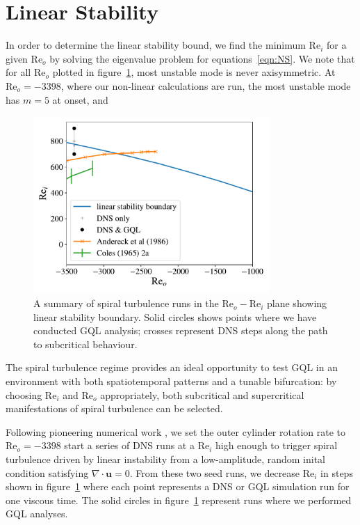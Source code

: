 \documentclass[openacc]{rstransa}%
\newcommand{\Reyn}{\mathrm{Re}}
\begin{document}
\section{Linear Stability}
\label{sec:linear}
In order to determine the linear stability bound, we find the minimum $\Reyn_i$ for a given $\Reyn_o$ by solving the eigenvalue problem for equations~\ref{eqn:NS}. We note that for all $\Reyn_o$ plotted in figure~\ref{fig:LSB}, most unstable mode is never axisymmetric. At $\Reyn_o=-3398$, where our non-linear calculations are run, the most unstable mode has $m = 5$ at onset, and 
\begin{figure}
    \centering
    \includegraphics[width=0.8\textwidth]{../figs/reo_rei_lsb.pdf}
    \caption{A summary of spiral turbulence runs in the $\Reyn_o-\Reyn_i$ plane showing linear stability boundary. Solid circles shows points where we have conducted GQL analysis; crosses represent DNS steps along the path to subcritical behaviour. }
    \label{fig:LSB}
\end{figure}
The spiral turbulence regime provides an ideal opportunity to test GQL in an environment with both spatiotemporal patterns and a tunable bifurcation: by choosing $\Reyn_i$ and $\Reyn_o$ appropriately, both subcritical and supercritical manifestations of spiral turbulence can be selected.

Following pioneering numerical work \cite{2009PhRvE..79c6309M, 2009PhRvE..80d6315M}, we set the outer cylinder rotation rate to $\Reyn_o = -3398$ 
start a series of DNS runs at a $\Reyn_i$ high enough to trigger spiral turbulence driven by linear instability from a low-amplitude, random inital condition satisfying $\nabla \cdot \mathbf{u} = 0$.
From these two seed runs, we decrease $\Reyn_i$ in steps shown in figure~\ref{fig:LSB} where each point represents a DNS or GQL simulation run for one viscous time. The solid circles in figure~\ref{fig:LSB} represent runs where we performed GQL analyses. 
\end{document}
